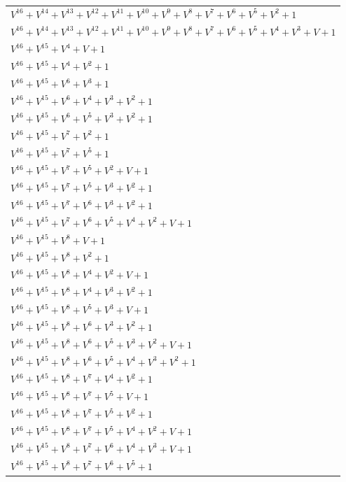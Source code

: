 \documentclass[12pt]{article}
\begin{document}
\begin{adjustwidth}{-4cm}{}
\begin{center}
\begin{longtable}{|l|}
$V^{16}  +V^{14}  +V^{13}  +V^{12}  +V^{11}  +V^{10}  +V^{9}  +V^{8}  +V^{7}  +V^{6}  +V^{5}  +V^{2}  + 1$ \\
$V^{16}  +V^{14}  +V^{13}  +V^{12}  +V^{11}  +V^{10}  +V^{9}  +V^{8}  +V^{7}  +V^{6}  +V^{5}  +V^{4}  +V^{3}  + V + 1$ \\
$V^{16}  +V^{15}  +V^{4}  + V + 1$ \\
$V^{16}  +V^{15}  +V^{4}  +V^{2}  + 1$ \\
$V^{16}  +V^{15}  +V^{6}  +V^{3}  + 1$ \\
$V^{16}  +V^{15}  +V^{6}  +V^{4}  +V^{3}  +V^{2}  + 1$ \\
$V^{16}  +V^{15}  +V^{6}  +V^{5}  +V^{3}  +V^{2}  + 1$ \\
$V^{16}  +V^{15}  +V^{7}  +V^{2}  + 1$ \\
$V^{16}  +V^{15}  +V^{7}  +V^{5}  + 1$ \\
$V^{16}  +V^{15}  +V^{7}  +V^{5}  +V^{2}  + V + 1$ \\
$V^{16}  +V^{15}  +V^{7}  +V^{5}  +V^{3}  +V^{2}  + 1$ \\
$V^{16}  +V^{15}  +V^{7}  +V^{6}  +V^{3}  +V^{2}  + 1$ \\
$V^{16}  +V^{15}  +V^{7}  +V^{6}  +V^{5}  +V^{4}  +V^{2}  + V + 1$ \\
$V^{16}  +V^{15}  +V^{8}  + V + 1$ \\
$V^{16}  +V^{15}  +V^{8}  +V^{2}  + 1$ \\
$V^{16}  +V^{15}  +V^{8}  +V^{4}  +V^{2}  + V + 1$ \\
$V^{16}  +V^{15}  +V^{8}  +V^{4}  +V^{3}  +V^{2}  + 1$ \\
$V^{16}  +V^{15}  +V^{8}  +V^{5}  +V^{3}  + V + 1$ \\
$V^{16}  +V^{15}  +V^{8}  +V^{6}  +V^{3}  +V^{2}  + 1$ \\
$V^{16}  +V^{15}  +V^{8}  +V^{6}  +V^{5}  +V^{3}  +V^{2}  + V + 1$ \\
$V^{16}  +V^{15}  +V^{8}  +V^{6}  +V^{5}  +V^{4}  +V^{3}  +V^{2}  + 1$ \\
$V^{16}  +V^{15}  +V^{8}  +V^{7}  +V^{4}  +V^{2}  + 1$ \\
$V^{16}  +V^{15}  +V^{8}  +V^{7}  +V^{5}  + V + 1$ \\
$V^{16}  +V^{15}  +V^{8}  +V^{7}  +V^{5}  +V^{2}  + 1$ \\
$V^{16}  +V^{15}  +V^{8}  +V^{7}  +V^{5}  +V^{4}  +V^{2}  + V + 1$ \\
$V^{16}  +V^{15}  +V^{8}  +V^{7}  +V^{6}  +V^{4}  +V^{3}  + V + 1$ \\
$V^{16}  +V^{15}  +V^{8}  +V^{7}  +V^{6}  +V^{5}  + 1$ \\

\end{longtable}
\end{center}
\end{adjustwidth}
\end{document}
